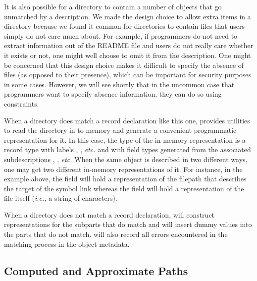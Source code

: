 \documentclass[nocopyrightspace,natbib]{sigplanconf}
\begin{document}
It is also possible for a directory to contain a number of objects that go unmatched by
a description.  We made the design choice to allow extra items in
a directory because we found it common for directories to contain files that users
simply do not care much about.  For example,
if programmers do not need to extract information out of the README file and
users do not really care whether it exists or not, one might well choose
to omit it from the description.  One might be concerned that this design choice makes it difficult to specify
the absence of files (as opposed to their presence), which can be important
for security purposes in some cases.  However, we will see shortly that in the
uncommon case that programmers want to specify absence information, they can
do so using constraints.

When a directory does match a record declaration like this one, 
\forest{} provides utilities to read the directory in
to memory and generate a convenient programmatic representation for it.  
In this case, the type of the in-memory representation is a record type
with labels , , {\em etc.} and with field types
generated from the associated \forest{} subdescriptions , ,
{\em etc.}  When the same object is described in two different ways, one may
get two different in-memory representations of it.  For instance, in the example above,
the  field will hold a representation of the filepath that describes the target of the
symbol link whereas the  field will hold a representation of the 
file itself ({\em i.e.,} a string of characters).

When a directory does not match a record declaration, \forest{} will
construct representations for the subparts that do match and will insert dummy values
into the parts that do not match.  \forest{} will also record all errors encountered in the
matching process in the object metadata.

\subsection{Computed and Approximate Paths}
\label{sec:computed-pathes}
\end{document}
